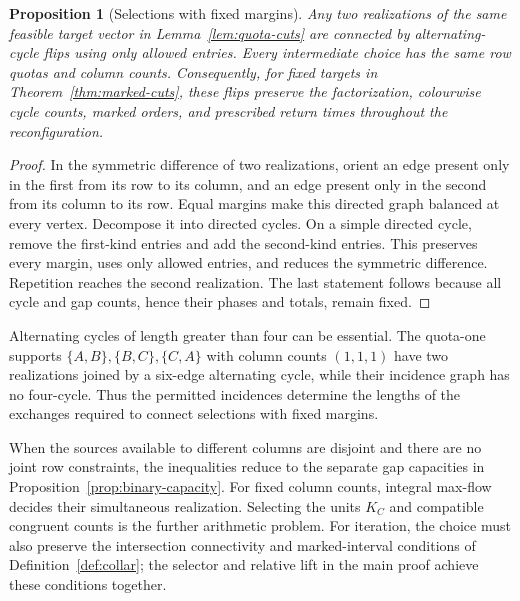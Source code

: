 \documentclass[11pt,reqno]{amsart}
\numberwithin{equation}{section}
\newtheorem{proposition}[theorem]{Proposition}
\theoremstyle{definition}
\theoremstyle{remark}
\begin{document}
\begin{proposition}[Selections with fixed margins]\label{prop:count-reconfiguration}
Any two realizations of the same feasible target vector in
Lemma~\ref{lem:quota-cuts} are connected by alternating-cycle flips
using only allowed entries. Every intermediate choice has the same
row quotas and column counts.
Consequently, for fixed targets in Theorem~\ref{thm:marked-cuts}, these
flips preserve the factorization, colourwise cycle counts, marked orders,
and prescribed return times throughout the reconfiguration.
\end{proposition}
\begin{proof}
In the symmetric difference of two realizations, orient an edge present
only in the first from its row to its column, and an edge present only
in the second from its column to its row. Equal margins make this
directed graph balanced at every vertex. Decompose it into directed
cycles. On a simple directed cycle, remove the first-kind entries and
add the second-kind entries. This preserves every margin, uses only
allowed entries, and reduces the symmetric difference. Repetition
reaches the second realization. The last statement follows because
all cycle and gap counts, hence their phases and totals, remain fixed.
\end{proof}

Alternating cycles of length greater than four can be essential.
The quota-one supports $\{A,B\},\{B,C\},\{C,A\}$ with column counts
$(1,1,1)$ have two realizations joined by a six-edge alternating cycle,
while their incidence graph has no four-cycle. Thus the permitted
incidences determine the lengths of the exchanges required to connect
selections with fixed margins.

When the sources available to different columns are disjoint and there
are no joint row constraints, the inequalities reduce to the separate
gap capacities in Proposition~\ref{prop:binary-capacity}. For fixed
column counts, integral max-flow decides their simultaneous realization.
Selecting the units $K_C$ and compatible congruent counts is the further
arithmetic problem. For iteration, the choice must also preserve the
intersection connectivity and marked-interval conditions of
Definition~\ref{def:collar}; the selector and relative lift in the main
proof achieve these conditions together.
\end{document}
